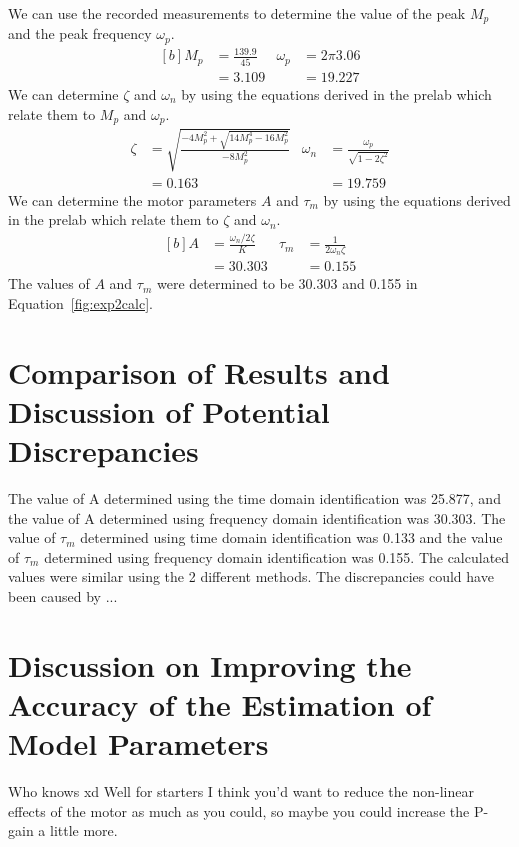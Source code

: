 \documentclass[12pt]{article}
\begin{document}
We can use the recorded measurements to determine the value of the peak $M_p$ and the peak frequency $\omega_p$.
\begin{equation*}
\begin{aligned}[b]
    M_p &= \frac{139.9}{45} & \omega_p &= 2\pi3.06 \\
    &= 3.109 & &= 19.227
\end{aligned}
\end{equation*}
We can determine $\zeta$ and $\omega_n$ by using the equations derived in the prelab which relate them to $M_p$ and $\omega_p$.
\begin{equation*}
\begin{aligned}
    \zeta &= \sqrt{\frac{-4M_p^2 + \sqrt{14M_p^4 - 16M_p^2}}{-8M_p^2}} & \omega_n &= \frac{\omega_p}{\sqrt{1-2\zeta^2}} \\
    &= 0.163 & &= 19.759
\end{aligned}
\end{equation*}
We can determine the motor parameters $A$ and $\tau_m$ by using the equations derived in the prelab which relate them to $\zeta$ and $\omega_n$.
\begin{equation} \label{fig:exp2calc}
\begin{aligned}[b]
    A &= \frac{\omega_n / 2\zeta}{K} & \tau_m &= \frac{1}{2\omega_n\zeta} \\
    &= 30.303 & &= 0.155
\end{aligned}
\end{equation}
The values of $A$ and $\tau_m$ were determined to be 30.303 and 0.155 in Equation~\ref{fig:exp2calc}.

\section*{Comparison of Results and Discussion of Potential Discrepancies}
The value of A determined using the time domain identification was 25.877, and the value of A determined using frequency domain identification was 30.303. The value of $\tau_m$ determined using time domain identification was 0.133 and the value of $\tau_m$ determined using frequency domain identification was 0.155. The calculated values were similar using the 2 different methods. The discrepancies could have been caused by ...

\section*{Discussion on Improving the Accuracy of the Estimation of Model Parameters}
Who knows xd
Well for starters I think you'd want to reduce the non-linear effects of the motor as much as you could, so maybe you could increase the P-gain a little more.
\end{document}
